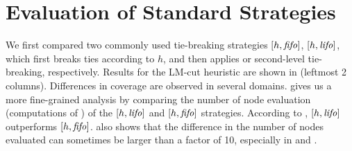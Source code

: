
\section{Evaluation of  Standard Strategies}
\label{sec:eval-common-strategies}

We first compared two commonly used tie-breaking strategies $[h,\mbox{\textit{fifo}}]$, $[h,\mbox{\textit{lifo}}]$, which
first breaks ties according to $h$, and then applies \fifo or \lifo
second-level tie-breaking, respectively.
Results for the LM-cut heuristic \cite{Helmert2009} are
shown in  (leftmost 2 columns).
Differences in coverage are observed in several domains.
% 
 gives us a
more fine-grained analysis by comparing the number of node evaluation
(computations of \lmcut) of the $[h,\mbox{\textit{lifo}}]$ and $[h,\mbox{\textit{fifo}}]$ strategies.
% 
According to ,
$[h,\mbox{\textit{lifo}}]$ outperforms $[h,\mbox{\textit{fifo}}]$.
 also shows that the difference in the number of nodes
evaluated can sometimes be larger than a factor of 10, especially in
 and .

